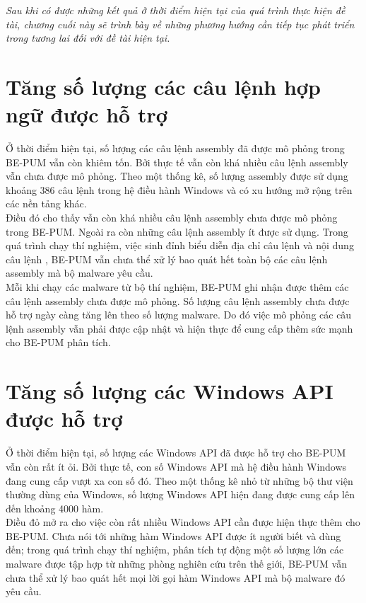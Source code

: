 
\fancyhead[R]{}

\begin{concept}[15cm]
\textit{Sau khi có được những kết quả ở thời điểm hiện tại của quá trình thực hiện đề tài, chương cuối này sẽ trình bày về những phương hướng cần tiếp tục phát triển trong tương lai đối với đề tài hiện tại.}
\end{concept}


\section{Tăng số lượng các câu lệnh hợp ngữ được hỗ trợ}
		Ở thời điểm hiện tại, số lượng các câu lệnh assembly đã được mô phỏng trong BE-PUM vẫn còn khiêm tốn. Bởi thực tế vẫn còn khá nhiều câu lệnh assembly vẫn chưa được mô phỏng. Theo một thống kê, số lượng assembly được sử dụng khoảng 386 câu lệnh trong hệ điều hành Windows và có xu hướng mở rộng trên các nền tảng khác.\\
		
		Điều đó cho thấy vẫn còn khá nhiều câu lệnh assembly chưa được mô phỏng trong BE-PUM. Ngoài ra còn những câu lệnh assembly ít được sử dụng. Trong quá trình chạy thí nghiệm, việc sinh đỉnh biểu diễn địa chỉ câu lệnh và nội dung câu lệnh , BE-PUM vẫn chưa thể xử lý bao quát hết toàn bộ các câu lệnh assembly mà bộ malware yêu cầu.\\
		
		Mỗi khi chạy các malware từ bộ thí nghiệm, BE-PUM ghi nhận được thêm các câu lệnh assembly chưa được mô phỏng. Số lượng câu lệnh assembly chưa được hỗ trợ ngày càng tăng lên theo số lượng malware. Do đó việc mô phỏng các câu lệnh assembly vẫn phải được cập nhật và hiện thực để cung cấp thêm sức mạnh cho BE-PUM phân tích.

\section{Tăng số lượng các Windows API được hỗ trợ}

Ở thời điểm hiện tại, số lượng các Windows API đã được hỗ trợ cho BE-PUM vẫn còn rất ít ỏi. Bởi thực tế, con số Windows API mà hệ điều hành Windows đang cung cấp vượt xa con số đó. Theo một thống kê nhỏ từ những bộ thư viện thường dùng của Windows, số lượng Windows API hiện đang được cung cấp lên đến khoảng 4000 hàm.\\

Điều đỏ mở ra cho việc còn rất nhiều Windows API cần được hiện thực thêm cho BE-PUM. Chưa nói tới những hàm Windows API được ít người biết và dùng đến; trong quá trình chạy thí nghiệm, phân tích tự động một số lượng lớn các malware được tập hợp từ những phòng nghiên cứu trên thế giới, BE-PUM vẫn chưa thể xử lý bao quát hết mọi lời gọi hàm Windows API mà bộ malware đó yêu cầu.\\

